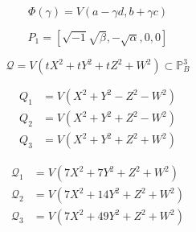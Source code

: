 \[
	\Phi(\gamma)=V(a-\gamma d, b+\gamma c)
\]


\[
	P_{1}=[\sqrt{-1} \sqrt{\beta},-\sqrt{\alpha}, 0,0]
\]

\[
	\mathscr{Q}=V\left(t X^{2}+t Y^{2}+t Z^{2}+W^{2}\right) \subset \mathbb{P}_{B}^{3}
\]


\[
\begin{aligned} Q_{1} &=V\left(X^{2}+Y^{2}-Z^{2}-W^{2}\right) \\ Q_{2} &=V\left(X^{2}+Y^{2}+Z^{2}-W^{2}\right) \\ Q_{3} &=V\left(X^{2}+Y^{2}+Z^{2}+W^{2}\right) \end{aligned}
\]

\[
\begin{aligned} \mathscr{Q}_{1} &=V\left(7 X^{2}+7 Y^{2}+Z^{2}+W^{2}\right) \\ \mathscr{Q}_{2} &=V\left(7 X^{2}+14 Y^{2}+Z^{2}+W^{2}\right) \\ \mathscr{Q}_{3} &=V\left(7 X^{2}+49 Y^{2}+Z^{2}+W^{2}\right) \end{aligned}
\]
